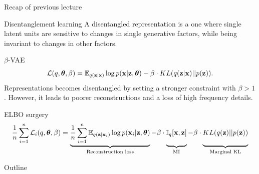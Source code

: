 \begin{frame}{Recap of previous lecture}
	\begin{block}{Disentanglement learning}
	A disentangled representation is a one where single latent units are sensitive to changes in single generative factors, while being invariant to changes in other factors. 
	\end{block}
	\begin{block}{$\beta$-VAE}
	\vspace{-0.2cm}
	\[
	    \mathcal{L}(q, \boldsymbol{\theta}, \beta) = \mathbb{E}_{q(\mathbf{z} | \mathbf{x})} \log p(\mathbf{x} | \mathbf{z}, \boldsymbol{\theta}) - \beta \cdot KL (q(\mathbf{z} | \mathbf{x}) || p(\mathbf{z})).
	\]
	Representations becomes disentangled by setting a stronger constraint with $\beta > 1$. However, it leads to poorer reconstructions and a loss of high frequency details. 
	\end{block}
	
	\begin{block}{ELBO surgery}
		\vspace{-0.3cm}
		{\footnotesize
			\[
			\frac{1}{n} \sum_{i=1}^n \cL_i(q, \btheta, \beta) = \underbrace{\frac{1}{n} \sum_{i=1}^n \mathbb{E}_{q(\bz | \bx_i)} \log p(\bx_i | \bz, \btheta)}_{\text{Reconstruction loss}} - \beta \cdot \underbrace{\bbI_{q} [\bx, \bz]\vphantom{\sum_{i=1}}}_{\text{MI}} - \beta \cdot \underbrace{KL(q(\bz) || p(\bz))\vphantom{\sum_{i=1}}}_{\text{Marginal KL}}
			\]}
	\end{block}
\end{frame}
\begin{frame}{Outline}
	\tableofcontents
\end{frame}
